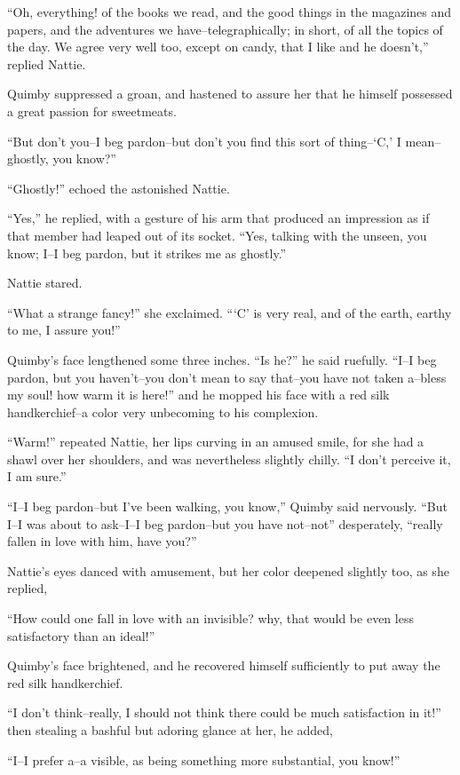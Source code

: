 ``Oh, everything! of the books we read, and the good things in the
magazines and papers, and the adventures we have--telegraphically; in
short, of all the topics of the day. We agree very well too, except on
candy, that I like and he doesn't,'' replied Nattie.

Quimby suppressed a groan, and hastened to assure her that he himself
possessed a great passion for sweetmeats.

``But don't you--I beg pardon--but don't you find this sort of
thing--`C,' I mean--ghostly, you know?''

``Ghostly!'' echoed the astonished Nattie.

``Yes,'' he replied, with a gesture of his arm that produced an impression
as if that member had leaped out of its socket. ``Yes, talking with the
unseen, you know; I--I beg pardon, but it strikes me as ghostly.''

Nattie stared.

``What a strange fancy!'' she exclaimed. ``{}`C' is very real, and of the
earth, earthy to me, I assure you!''

Quimby's face lengthened some three inches. ``Is he?'' he said ruefully.
``I--I beg pardon, but you haven't--you don't mean to say that--you have
not taken a--bless my soul! how warm it is here!'' and he mopped his face
with a red silk handkerchief--a color very unbecoming to his complexion.

``Warm!'' repeated Nattie, her lips curving in an amused smile, for she
had a shawl over her shoulders, and was nevertheless slightly chilly. ``I
don't perceive it, I am sure.''

``I--I beg pardon--but I've been walking, you know,'' Quimby said
nervously. ``But I--I was about to ask--I--I beg pardon--but you have
not--not'' desperately, ``really fallen in love with him, have you?''

Nattie's eyes danced with amusement, but her color deepened slightly
too, as she replied,

``How could one fall in love with an invisible? why, that would be even
less satisfactory than an ideal!''

Quimby's face brightened, and he recovered himself sufficiently to put
away the red silk handkerchief.

``I don't think--really, I should not think there could be much
satisfaction in it!'' then stealing a bashful but adoring glance at her,
he added,

``I--I prefer a--a visible, as being something more substantial, you
know!''

